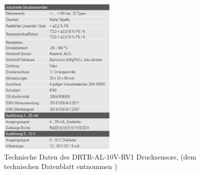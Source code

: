 \begin{figure}[h!] %
\centering
\includegraphics[width=0.5\textwidth]{Bilder/drtr-technische-Daten.jpg}
\vspace{0em}
 \caption[]{Technische Daten des DRTR-AL-10V-RV1 Drucksensors, (dem technischen Datenblatt entnommen \cite{BTTG2021})}\label{fig:BTTG2021}
\end{figure}

%



%

%
%
